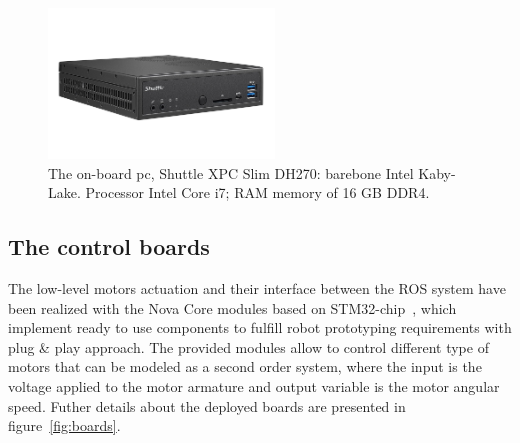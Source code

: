 \begin{figure}[H]
	\centering
	\includegraphics[width=6cm]{images/03-foundation/onboardpc}
	\caption{The on-board pc, Shuttle XPC Slim DH270: barebone Intel Kaby-Lake. Processor Intel Core i7; RAM memory of 16 GB DDR4.}
	\label{onboardpc}
\end{figure}

\subsection{The control boards}
\label{novacore}
The low-level motors actuation and their interface between the ROS system have been realized with the Nova Core modules based on STM32-chip~\cite{noauthor_nova_nodate}, which implement ready to use components to fulfill robot prototyping requirements with plug \& play approach.  
The provided modules allow to control different type of motors that can be modeled as a second order system, where the input is the voltage applied to the motor armature and output variable is the motor angular speed. Futher details about the deployed boards are presented in figure~\ref{fig:boards}.


